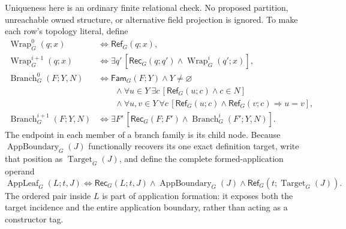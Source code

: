 \documentclass[11pt,twoside]{article}
\newcommand{\Rec}{\mathsf{Rec}}
\newcommand{\Fam}{\mathsf{Fam}}
\newcommand{\RefPos}{\mathsf{Ref}}
\begin{document}
Uniqueness here is an ordinary finite relational check.  No proposed partition,
unreachable owned structure, or alternative field projection is ignored.  To
make each row's topology literal, define
\[
\begin{aligned}
 \operatorname{Wrap}^0_G(q;x)&\Longleftrightarrow\RefPos_G(q;x),\\
 \operatorname{Wrap}^{i+1}_G(q;x)&\Longleftrightarrow
   \exists q'\,[\Rec_G(q;q')\land\operatorname{Wrap}^{i}_G(q';x)],\\
 \operatorname{Branch}^0_G(F;Y,N)&\Longleftrightarrow
   \Fam_G(F;Y)\land Y\ne\varnothing\\[-0.3em]
 &\qquad{}\land\forall u\in Y\ \exists c\,
       [\RefPos_G(u;c)\land c\in N]\\[-0.3em]
 &\qquad{}\land\forall u,v\in Y\ \forall c\,
   [\RefPos_G(u;c)\land\RefPos_G(v;c)\Rightarrow u=v],\\
 \operatorname{Branch}^{i+1}_G(F;Y,N)&\Longleftrightarrow
   \exists F'\,[\Rec_G(F;F')\land
                    \operatorname{Branch}^{i}_G(F';Y,N)].
\end{aligned}
\]
The endpoint in each member of a branch family is its child node.  Because
\(\operatorname{AppBoundary}_G(J)\) functionally recovers its one exact definition
target, write that position as \(\operatorname{Target}_G(J)\), and define the
complete formed-application operand
\[
 \operatorname{AppLeaf}_G(L;t,J)\Longleftrightarrow
 \Rec_G(L;t,J)\land\operatorname{AppBoundary}_G(J)
 \land\RefPos_G(t;\operatorname{Target}_G(J)).
\]
The ordered pair inside \(L\) is part of application formation: it exposes both
the target incidence and the entire application boundary, rather than acting as a
constructor tag.
\end{document}
